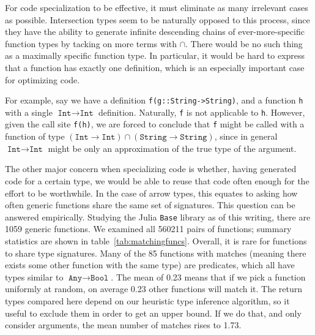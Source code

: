 For code specialization to be effective, it must eliminate as many
irrelevant cases as possible. Intersection types seem to be naturally
opposed to this process, since they have the ability to
generate infinite descending chains of ever-more-specific function
types by tacking on more terms with $\cap$. There would be no such
thing as a maximally specific function type. In particular, it would be
hard to express that a function has exactly one definition,
which is an especially important case for optimizing code.

For example, say we have a definition \texttt{f(g::String->String)},
and a function \texttt{h} with a single $\texttt{Int}\rightarrow\texttt{Int}$ definition.
Naturally, \texttt{f} is not applicable to \texttt{h}.
However, given the call site \texttt{f(h)}, we are forced to conclude
that \texttt{f} might be called with a function of type
\mbox{$(\texttt{Int}\rightarrow\texttt{Int})\cap(\texttt{String}\rightarrow\texttt{String})$},
since in general $\texttt{Int}\rightarrow\texttt{Int}$ might be only an
approximation of the true type of the argument.


The other major concern when specializing code is whether, having generated code
for a certain type, we would be able to reuse that code often enough for the
effort to be worthwhile.
In the case of arrow types, this equates to asking how often generic functions
share the same set of signatures.
This question can be answered empirically.
Studying the Julia \texttt{Base} library as of this writing, there are 1059
generic functions. We examined all 560211 pairs of functions; summary
statistics are shown in table~\ref{tab:matchingfuncs}.
Overall, it is rare for functions to share type signatures.
Many of the 85 functions with matches (meaning there exists some other function
with the same type) are predicates, which all have types similar to
$\texttt{Any}\rightarrow \texttt{Bool}$. The mean of 0.23 means that if we
pick a function uniformly at random, on average 0.23 other functions will
match it.
The return types compared here depend on our heuristic type inference algorithm,
so it useful to exclude them in order to get an upper bound.
If we do that, and only consider arguments, the mean number of matches rises to 1.73.

